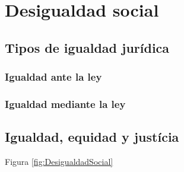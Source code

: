 \chapter{Desigualdad social }
\section{Tipos de igualdad jurídica}
\subsection{Igualdad ante la ley}
\subsection{Igualdad mediante la ley}

\section{Igualdad, equidad y justícia }
 Figura \ref{fig:DesigualdadSocial}

